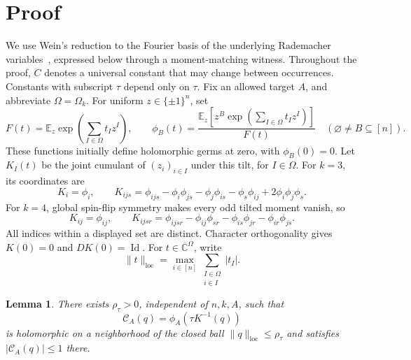 \documentclass[11pt]{article}
\newtheorem{lemma}{Lemma}
\newcommand{\E}{\mathbb E}
\newcommand{\C}{\mathbb C}
\newcommand{\loc}{\mathrm{loc}}
\DeclareMathOperator{\Id}{Id}
\begin{document}
\section{Proof}

We use Wein's reduction to the Fourier basis of the underlying Rademacher variables~\cite[Sections~1.4.1 and~3.1--3.2]{Wein2023}, expressed below through a moment-matching witness.
Throughout the proof, \(C\) denotes a universal constant that may change between occurrences.
Constants with subscript \(\tau\) depend only on \(\tau\).
Fix an allowed target \(A\), and abbreviate \(\Omega=\Omega_k\).
For uniform \(z\in\{\pm1\}^n\), set
\begin{equation}\label{eq:tilt}
F(t)=\E_z\exp\left(\sum_{I\in\Omega}t_Iz^I\right),
\qquad
\phi_B(t)=
\frac{\E_z[z^B\exp(\sum_{I\in\Omega}t_Iz^I)]}{F(t)}
\quad(\varnothing\ne B\subseteq[n]).
\end{equation}
These functions initially define holomorphic germs at zero, with \(\phi_B(0)=0\).
Let \(K_I(t)\) be the joint cumulant of \((z_i)_{i\in I}\) under this tilt, for \(I\in\Omega\).
For \(k=3\), its coordinates are
\begin{equation}\label{eq:k3}
K_i=\phi_i,\qquad
K_{ijs}
=\phi_{ijs}-\phi_i\phi_{js}-\phi_j\phi_{is}
-\phi_s\phi_{ij}+2\phi_i\phi_j\phi_s .
\end{equation}
For \(k=4\), global spin-flip symmetry makes every odd tilted moment vanish, so
\begin{equation}\label{eq:k4}
K_{ij}=\phi_{ij},\qquad
K_{ijsr}
=\phi_{ijsr}-\phi_{ij}\phi_{sr}
-\phi_{is}\phi_{jr}-\phi_{ir}\phi_{js}.
\end{equation}
All indices within a displayed set are distinct.
Character orthogonality gives \(K(0)=0\) and \(DK(0)=\Id\).
For \(t\in\C^\Omega\), write
\begin{equation}\label{eq:local-norm}
\|t\|_{\loc}=\max_{i\in[n]}\sum_{\substack{I\in\Omega\\i\in I}}|t_I|.
\end{equation}

\begin{lemma}\label{lem:analytic}
There exists \(\rho_\tau>0\), independent of \(n,k,A\), such that
\begin{equation}\label{eq:response}
\mathcal C_A(q)=\phi_A(\tau K^{-1}(q))
\end{equation}
is holomorphic on a neighborhood of the closed ball
\(\|q\|_{\loc}\le\rho_\tau\) and satisfies \(|\mathcal C_A(q)|\le1\) there.
\end{lemma}
\end{document}
